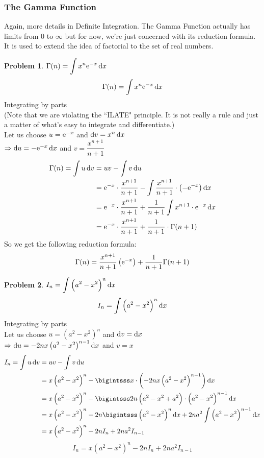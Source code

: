 \documentclass[14]{article}
\theoremstyle{definition}
\newtheorem{prob}{Problem}
\theoremstyle{case}
\begin{document}
\subsubsection*{The Gamma Function}
Again, more details in Definite Integration. The Gamma Function actually has limits from $0$ to $\infty$ but for now, we're just concerned with its reduction formula. It is used to extend the idea of factorial to the set of real numbers.
\begin{prob}
$\Gamma(n) = \displaystyle\int x^n {\rm e}^{-x} \dif x$
\[\Gamma(n) = \int x^n {\rm e}^{-x} \dif x\]
Integrating by parts\\
(Note that we are violating the ``ILATE" principle. It is not really a rule and just a matter of what's easy to integrate and differentiate.)\\
Let us choose $u = {\rm e}^{-x}$ and $\dif v = x^n \dif x$\\
$\Rightarrow \dif u = -{\rm e}^{-x} \dif x$ and $v = \dfrac{x^{n+1}}{n+1}$
\begin{align*}
\Gamma(n) = \int u \dif v &= uv - \int v \dif u\\
&= {\rm e}^{-x} \cdot \dfrac{x^{n+1}}{n+1} - \int \dfrac{x^{n+1}}{n+1} \cdot \left(-{\rm e}^{-x}\right) \dif x\\
&= {\rm e}^{-x} \cdot \dfrac{x^{n+1}}{n+1} + \dfrac1{n+1}\int x^{n+1} \cdot {\rm e}^{-x} \dif x\\
&= {\rm e}^{-x} \cdot \dfrac{x^{n+1}}{n+1} + \dfrac1{n+1}\cdot \Gamma(n+1)
\end{align*}
So we get the following reduction formula:
\[\Gamma(n) = \dfrac{x^{n+1}}{n+1} \left({\rm e}^{-x}\right) + \dfrac1{n+1} \Gamma(n+1)\]
\end{prob}
\pagebreak
\begin{prob}
$I_n = \displaystyle \int \left( a^2 - x^2 \right)^n \dif x$
\[I_n = \int \left( a^2 - x^2 \right)^n \dif x\]
Integrating by parts\\
Let us choose $u = \left( a^2 - x^2\right)^n$ and $\dif v = \dif x$\\
$\Rightarrow \dif u = -2nx\left( a^2 - x^2 \right)^{n-1}\dif x$ and $v=x$
\begin{align*}
I_n = \int u \dif v &= uv - \int v \dif u\\
&= x\left( a^2 - x^2\right)^n - \bigintsss x\cdot \left( -2nx\left( a^2 - x^2 \right)^{n-1} \right) \dif x\\
&= x\left( a^2 - x^2\right)^n - \bigintsss 2n\left( a^2 - x^2 + a^2\right)\cdot \left( a^2 - x^2 \right)^{n-1} \dif x\\
&= x\left( a^2 - x^2\right)^n - 2n \bigintsss\left( a^2 - x^2\right)^n \dif x + 2na^2 \int \left( a^2 - x^2 \right)^{n-1} \dif x\\
&= x\left( a^2 - x^2\right)^n - 2n I_n + 2na^2 I_{n-1}
\end{align*}
\[I_n = x\left( a^2 - x^2\right)^n - 2n I_n + 2na^2 I_{n-1}\]
\end{prob}
\end{document}
